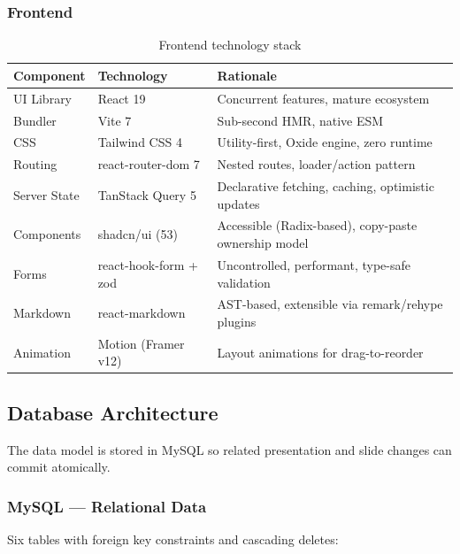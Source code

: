 \documentclass[10pt,a4paper]{article}
\begin{document}
\subsubsection{Frontend}

\begin{table}[H]
\centering\small
\renewcommand{\arraystretch}{1.2}
\begin{tabularx}{\linewidth}{@{} l l X @{}}
\toprule
\textbf{Component} & \textbf{Technology} & \textbf{Rationale} \\
\midrule
UI Library     & React 19              & Concurrent features, mature ecosystem \\
Bundler        & Vite 7                & Sub-second HMR, native ESM \\
CSS            & Tailwind CSS 4        & Utility-first, Oxide engine, zero runtime \\
Routing        & react-router-dom 7    & Nested routes, loader/action pattern \\
Server State   & TanStack Query 5      & Declarative fetching, caching, optimistic updates \\
Components     & shadcn/ui (53)        & Accessible (Radix-based), copy-paste ownership model \\
Forms          & react-hook-form + zod & Uncontrolled, performant, type-safe validation \\
Markdown       & react-markdown        & AST-based, extensible via remark/rehype plugins \\
Animation      & Motion (Framer v12)   & Layout animations for drag-to-reorder \\
\bottomrule
\end{tabularx}
\vspace{-0.5em}\caption{Frontend technology stack}
\end{table}

\subsection{Database Architecture}

The data model is stored in MySQL so related presentation and slide changes can
commit atomically.

\subsubsection{MySQL --- Relational Data}

Six tables with foreign key constraints and cascading deletes:
\end{document}
